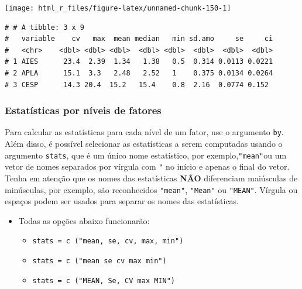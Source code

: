 \documentclass[
]{book}
\providecommand{\tightlist}{%
  \setlength{\itemsep}{0pt}\setlength{\parskip}{0pt}}
\numberwithin{equation}{section}
\begin{document}
\texttt{[image: html\_r\_files/figure-latex/unnamed-chunk-150-1]}

\begin{verbatim}
# # A tibble: 3 x 9
#   variable    cv   max  mean median   min sd.amo     se     ci
#   <chr>    <dbl> <dbl> <dbl>  <dbl> <dbl>  <dbl>  <dbl>  <dbl>
# 1 AIES      23.4  2.39  1.34   1.38   0.5  0.314 0.0113 0.0221
# 2 APLA      15.1  3.3   2.48   2.52   1    0.375 0.0134 0.0264
# 3 CESP      14.3 20.4  15.2   15.4    0.8  2.16  0.0774 0.152
\end{verbatim}

\hypertarget{estatuxedsticas-por-nuxedveis-de-fatores}{%
\subsubsection{Estatísticas por níveis de fatores}\label{estatuxedsticas-por-nuxedveis-de-fatores}}

Para calcular as estatísticas para cada nível de um fator, use o argumento \texttt{by}. Além disso, é possível selecionar as estatísticas a serem computadas usando o argumento \texttt{stats}, que é um único nome estatístico, por exemplo,\texttt{"mean"}ou um vetor de nomes separados por vírgula com \texttt{"} no início e apenas o final do vetor. Tenha em atenção que os nomes das estatísticas \textbf{NÃO} diferenciam maiúsculas de minúsculas, por exemplo, são reconhecidos \texttt{"mean"}, \texttt{"Mean"} ou \texttt{"MEAN"}. Vírgula ou espaços podem ser usados para separar os nomes das estatísticas.

\begin{itemize}
\item
  Todas as opções abaixo funcionarão:

  \begin{itemize}
  \tightlist
  \item
    \texttt{stats\ =\ c\ ("mean,\ se,\ cv,\ max,\ min")}
  \item
    \texttt{stats\ =\ c\ ("mean\ se\ cv\ max\ min")}
  \item
    \texttt{stats\ =\ c\ ("MEAN,\ Se,\ CV\ max\ MIN")}
  \end{itemize}
\end{itemize}
\end{document}

